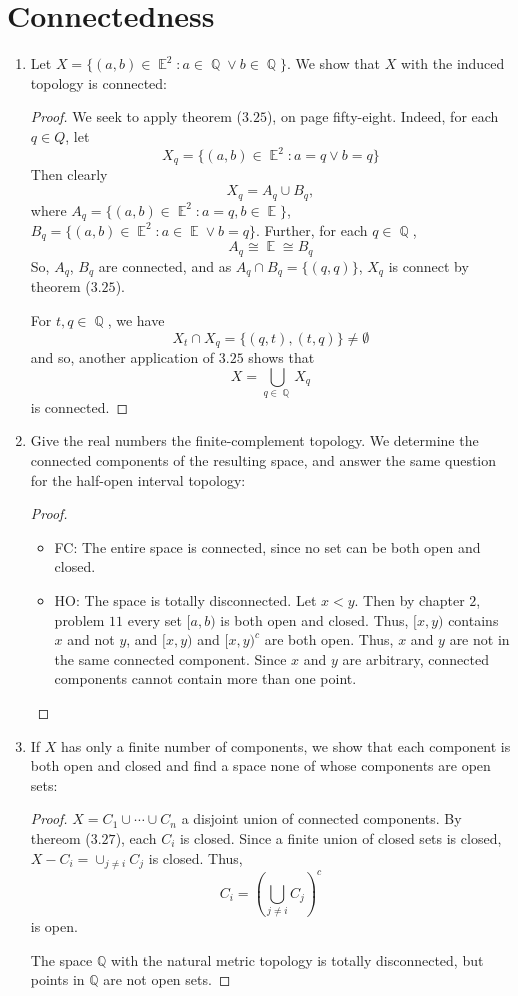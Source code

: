 \documentclass{book}
\DeclareMathOperator*{\Q}{\mathbb{Q}}
\DeclareMathOperator*{\E}{\mathbb{E}}
\begin{document}
\section{Connectedness}
\begin{enumerate}[(1)]
    \item Let $X = \{ (a,b) \in \E^2 : a \in \Q \lor b \in \Q\}$. We show that $X$ with the induced topology is connected: 
        \begin{proof} We seek to apply theorem ($3.25$), on page fifty-eight. Indeed, for each $q \in Q$, let 
            \[X_q = \{ (a,b) \in \E^2 : a = q \lor b = q\}\]
            Then clearly 
            \[X_q = A_q \cup B_q,\]
            where $A_q = \{ (a,b) \in \E^2 : a = q, b \in \E \}$, $B_q = \{ (a,b) \in \E^2 : a \in \E \lor b = q\}$. Further, for each $q \in \Q$, 
            \[A_q \cong \E \cong B_q\]
            So, $A_q$, $B_q$ are connected, and as $A_q \cap B_q = \{(q,q)\}$, $X_q$ is connect by theorem ($3.25$).
            \par For $t,q \in \Q$, we have 
            \[ X_t \cap X_q = \{(q,t), (t,q)\} \neq \emptyset\]
            and so, another application of $3.25$ shows that 
            \[X = \bigcup_{q \in \Q} X_q\]
            is connected. 
        \end{proof}

    \item Give the real numbers the finite-complement topology. We determine the connected components of the resulting space, and answer the same question for the half-open interval topology: 
        \begin{proof} $ $\newline
            \begin{itemize}
                \item FC: The entire space is connected, since no set can be both open and closed.

                \item HO: The space is totally disconnected.  Let $x<y$.  Then by chapter $2$, problem $11$ every set $[a,b)$ is both open and closed. Thus, $[x,y)$ contains $x$ and not $y$, and $[x,y)$ and $[x,y)^c$ are both open.  Thus, $x$ and $y$ are not in the same connected component. Since $x$ and $y$ are arbitrary, connected components cannot contain more than one point.
            \end{itemize}
        \end{proof}

    \item If $X$ has only a finite number of components, we show that each component is both open and closed and find a space none of whose components are open sets: 
        \begin{proof} $X = C_1\cup\cdots\cup C_n$ a disjoint union of connected components.  By thereom ($3.27$), each $C_i$ is closed.  Since a finite union of closed sets is closed, $X - C_i=\cup_{j\not=i}C_j$ is closed.  Thus, 
            \[C_i= \left(\bigcup_{j\not=i}C_j\right)^c\] is open.  
            \par The space $\mathbb Q$ with the natural metric topology is totally disconnected, but points in $\mathbb Q$ are not open sets.
        \end{proof}


\end{enumerate}
\end{document}
